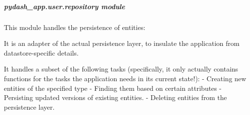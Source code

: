 \documentclass[letterpaper,10pt,english]{sphinxmanual}
\begin{document}
\begin{fulllineitems}
\begin{fulllineitems}
\end{fulllineitems}


\begin{fulllineitems}
\label{\detokenize{pydash_app.user.entity:pydash_app.user.entity.User.is_verified}}
\end{fulllineitems}


\begin{fulllineitems}
\label{\detokenize{pydash_app.user.entity:pydash_app.user.entity.User.set_password}}
\end{fulllineitems}


\end{fulllineitems}



\subparagraph{pydash\_app.user.repository module}
\label{\detokenize{pydash_app.user.repository:module-pydash_app.user.repository}}\label{\detokenize{pydash_app.user.repository:pydash-app-user-repository-module}}\label{\detokenize{pydash_app.user.repository::doc}}
This module handles the persistence of  entities:

It is an adapter of the actual persistence layer, to insulate the application
from datastore-specific details.

It handles a subset of the following tasks
(specifically, it only actually contains functions for the tasks the application needs in its current state!):
- Creating new entities of the specified type
- Finding them based on certain attributes
- Persisting updated versions of existing entities.
- Deleting entities from the persistence layer.
\end{document}
